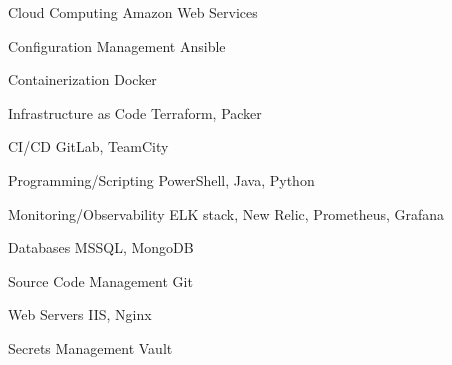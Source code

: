 \begin{cvskills}
\begin{multicols}{2}


\cvskill
{Cloud Computing} %
{ %
 Amazon Web Services
}


\cvskill
{Configuration Management} %
{ %
 Ansible
}


\cvskill
{Containerization} %
{ %
Docker
}


\cvskill
{Infrastructure as Code} %
{ %
  Terraform,
  Packer
}


\cvskill
{CI/CD} %
{ %
  GitLab,
  TeamCity
}


\cvskill
{Programming/Scripting} %
{ %
  PowerShell,
  Java,
  Python
}


\cvskill
{Monitoring/Observability} %
{ %
  ELK stack,
  New Relic,
  Prometheus,
  Grafana
}


\cvskill
{Databases} %
{ %
  MSSQL,
  MongoDB
}


\cvskill
{Source Code Management} %
{ %
  Git
}


\cvskill
{Web Servers} %
{ %
  IIS,
  Nginx
}


\cvskill
{Secrets Management} %
{ %
  Vault
}

\end{multicols}
\end{cvskills}
